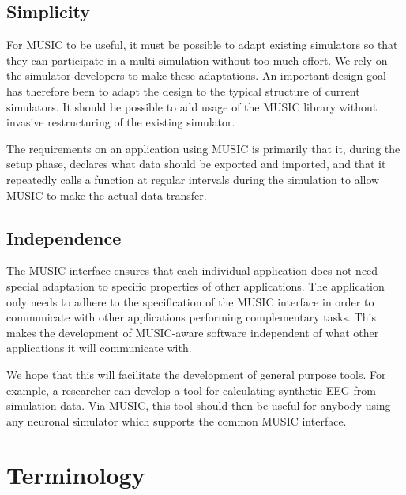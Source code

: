 \documentclass[a4paper]{report}
\begin{document}
\subsection{Simplicity}

For MUSIC to be useful, it must be possible to adapt existing
simulators so that they can participate in a multi-simulation without
too much effort.  We rely on the simulator developers to make these
adaptations.  An important design goal has therefore been to adapt the
design to the typical structure of current simulators.  It should be
possible to add usage of the MUSIC library without invasive
restructuring of the existing simulator.

The requirements on an application using MUSIC is primarily that it,
during the setup phase, declares what data should be exported and
imported, and that it repeatedly calls a function at regular intervals
during the simulation to allow MUSIC to make the actual data transfer.


\subsection{Independence}

The MUSIC interface ensures that each individual application does not
need special adaptation to specific properties of other applications.
The application only needs to adhere to the specification of the MUSIC
interface in order to communicate with other applications performing
complementary tasks.  This makes the development of MUSIC-aware
software independent of what other applications it will communicate
with.

We hope that this will facilitate the development of general purpose
tools.  For example, a researcher can develop a tool for calculating
synthetic EEG from simulation data.  Via MUSIC, this tool should then
be useful for anybody using any neuronal simulator which supports the
common MUSIC interface.


\section{Terminology}
\end{document}
